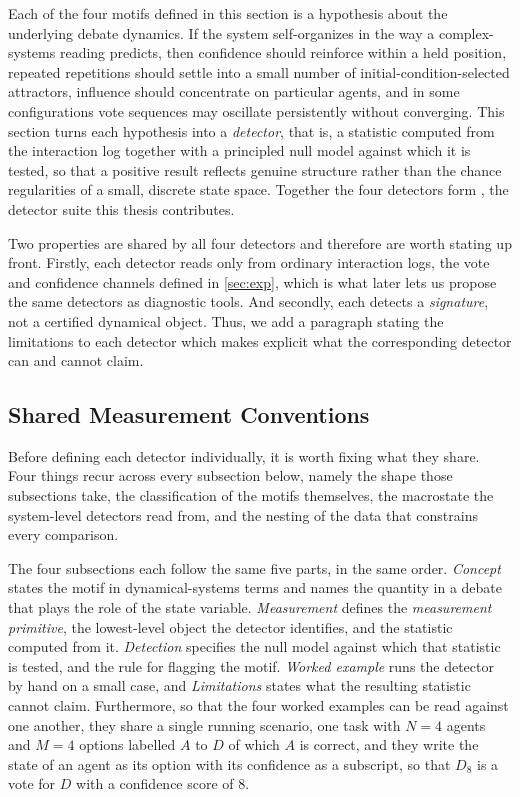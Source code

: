 Each of the four motifs defined in this section is a hypothesis about the
underlying debate dynamics. If the system self-organizes in the way a
complex-systems reading predicts, then confidence should reinforce within a held
position, repeated repetitions should settle into a small number of
initial-condition-selected attractors, influence should concentrate on particular
agents, and in some configurations vote sequences may oscillate persistently
without converging. This section turns each hypothesis into a \emph{detector}, that is, a
statistic computed from the interaction log together with a principled null model
against which it is tested, so that a positive result reflects genuine structure
rather than the chance regularities of a small, discrete state space. Together the
four detectors form \suitename{}, the detector suite this thesis contributes.

Two properties are shared by all four detectors and therefore are worth stating up
front. Firstly, each detector reads only from ordinary interaction logs, the vote
and confidence channels defined in \autoref{sec:exp}, which is what later lets us
propose the same detectors as diagnostic tools. And secondly, each detects a
\emph{signature}, not a certified dynamical object. Thus, we add a
paragraph stating the limitations to each detector which makes explicit what the
corresponding detector can and cannot claim.

\subsection{Shared Measurement Conventions}
\label{sec:method:vocab}

Before defining each detector individually, it is worth fixing what they share.
Four things recur across every subsection below, namely the shape those subsections take,
the classification of the motifs themselves, the macrostate the system-level
detectors read from, and the nesting of the data that constrains every comparison.

The four subsections each follow the same five parts, in the same order.
\emph{Concept} states the motif in dynamical-systems terms and names the quantity
in a debate that plays the role of the state variable. \emph{Measurement} defines
the \emph{measurement primitive}, the lowest-level object the detector identifies, and
the statistic computed from it. \emph{Detection} specifies the null model
against which that statistic is tested, and the rule for flagging the motif. 
\emph{Worked example} runs the detector by hand on a small case, and \emph{Limitations} states
what the resulting statistic cannot claim. Furthermore, so that
the four worked examples can be read against one another, they share a single
running scenario, one task with $N = 4$ agents and $M = 4$ options labelled $A$ to
$D$ of which $A$ is correct, and they write the state of an agent as its option with its
confidence as a subscript, so that $D_8$ is a vote for $D$ with a confidence score of $8$.

